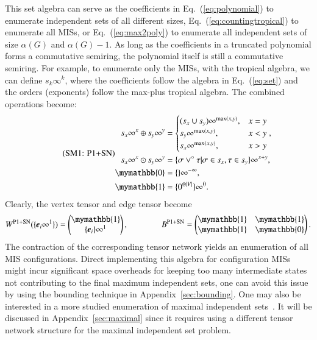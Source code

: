 \documentclass[onefignum, onetabnum]{siamart190516}
\newcommand{\eqname}[1]{\stepcounter{equation}\tag{\theequation : #1}}
\newcommand{\<}{\langle}
\renewcommand{\>}{\rangle}
\newcommand{\Eq}[1]{Eq.~(\ref{#1})}
\newcommand{\App}[1]{Appendix~\ref{#1}}
\newcounter{example}
\begin{document}
This set algebra can serve as the coefficients in \Eq{eq:polynomial} to enumerate independent sets of all different sizes, \Eq{eq:countingtropical} to enumerate all MISs,
or \Eq{eq:max2poly} to enumerate all independent sets of size $\alpha(G)$ and $\alpha(G)-1$.
As long as the coefficients in a truncated polynomial forms a commutative semiring, the polynomial itself is still a commutative semiring.
For example, to enumerate only the MISs, with the tropical algebra, we can define $s_{k}\infty^k$,
where the coefficients follow the algebra in \Eq{eq:set} and the orders (exponents) follow the max-plus tropical algebra.
The combined operations become: 
\begin{equation}
\eqname{P1+SN}
\begin{split}
    s_x\infty^x \oplus s_y\infty^y &= \begin{cases}
        (s_x \cup s_y)\infty^{\max(x,y)}, & x = y\\
        s_y\infty^{\max(x,y)}, & x < y\\
        s_x\infty^{\max(x,y)}, & x > y
    \end{cases},\\
    s_x\infty^x \odot s_y\infty^y &= \{\sigma \lor^\circ \tau | \sigma \in s_x, \tau \in s_y\}\infty^{x+y},\\
    \mymathbb{0} &= \{\}\infty^{-\infty},\\
    \mymathbb{1} &= \{0^{\otimes |V|}\}\infty^{0}. \label{eq:countingtropicalset}
\end{split}
\end{equation}
Clearly, the vertex tensor and edge tensor become
\begin{equation}
    W^{\rm P1+SN}(\{\boldsymbol{e}_{i}\infty^1\}) = \left(\begin{matrix}
        \mymathbb{1} \\
        \{\boldsymbol{e}_{i}\}\infty^1
    \end{matrix}\right),   
    \qquad \qquad
        B^{\rm P1+SN} = \left(\begin{matrix}
        \mymathbb{1}  & \mymathbb{1} \\
        \mymathbb{1} & \mymathbb{0}
    \end{matrix}\right).
\end{equation}
The contraction of the corresponding tensor network yields an enumeration of all MIS configurations.
Direct implementing this algebra for configuration MISs might incur significant space overheads for keeping too many intermediate states not contributing to the final maximum independent sets,
one can avoid this issue by using the bounding technique in \App{sec:bounding}.
One may also be interested in a more studied enumeration of maximal independent sets~\cite{Bron1973, Eppstein2010, Johnson1988}. It will be discussed in \App{sec:maximal} since it requires using a different tensor network structure for the maximal independent set problem.
\end{document}
